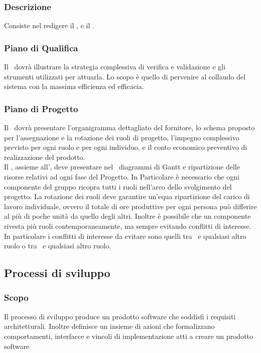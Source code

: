 \documentclass[12pt,a4paper]{article}
\begin{document}
\subsubsection{Descrizione}
Consiste nel redigere il \PdQ, e il \PdP.

\subsubsection{Piano di Qualifica}
Il \PdQ\ dovrà illustrare la strategia complessiva di verifica e validazione e gli strumenti utilizzati per attuarla. Lo scopo è quello di pervenire al collaudo del sistema con la massima efficienza ed efficacia.

\subsubsection{Piano di Progetto} %
Il \PdP\ dovrà presentare l'organigramma dettagliato del fornitore, lo schema proposto per l'assegnazione e la rotazione dei ruoli di progetto, l'impegno complessivo previsto per ogni ruolo e per ogni individuo, e il conto economico preventivo di realizzazione del prodotto.\\
Il \PM, assieme all'\AM, deve presentare nel \PdP\ diagrammi di Gantt e ripartizione delle risorse relativi ad ogni fase del Progetto. In Particolare è necessario che ogni componente del gruppo ricopra tutti i ruoli nell'arco dello svolgimento del progetto. La rotazione dei ruoli deve garantire un'equa ripartizione del carico di lavoro individuale, ovvero il totale di ore produttive per ogni persona può differire al più di poche unità da quello degli altri. Inoltre è possibile che un componente rivesta più ruoli contemporaneamente, ma sempre evitando conflitti di interesse. In particolare i conflitti di interesse da evitare sono quelli tra \PM\ e qualsiasi altro ruolo o tra \VR\ e qualsiasi altro ruolo.

\subsection{Processi di sviluppo}

\subsubsection{Scopo}
Il processo di sviluppo produce un prodotto software che soddisfi i requisiti architetturali. Inoltre definisce un insieme di azioni che formalizzano comportamenti, interfacce e vincoli di implementazione atti a creare un prodotto software
\end{document}
